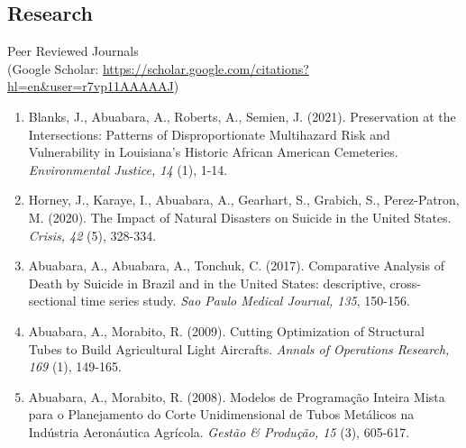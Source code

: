 \documentclass[11pt,oneside]{article}
\begin{document}
\subsection*{Research}

{Peer Reviewed Journals}\\{\small (Google Scholar: \url{https://scholar.google.com/citations?hl=en&user=r7vp11AAAAAJ})}
\begin{enumerate}[leftmargin=20pt]
\item Blanks, J., Abuabara, A., Roberts, A., Semien, J. (2021). Preservation at the Intersections: Patterns of Disproportionate Multihazard Risk and Vulnerability in Louisiana's Historic African American Cemeteries. \emph{Environmental Justice, 14} (1), 1-14.
\item Horney, J., Karaye, I., Abuabara, A., Gearhart, S., Grabich, S., Perez-Patron, M. (2020). The Impact of Natural Disasters on Suicide in the United States. \emph{Crisis, 42} (5), 328-334.
\item Abuabara, A., Abuabara, A., Tonchuk, C. (2017). Comparative Analysis of Death by Suicide in Brazil and in the United States: descriptive, cross-sectional time series study. \emph{Sao Paulo Medical Journal, 135}, 150-156.
\item Abuabara, A., Morabito, R. (2009). Cutting Optimization of Structural Tubes to Build Agricultural Light Aircrafts. \emph{Annals of Operations Research, 169} (1), 149-165.
\item Abuabara, A., Morabito, R. (2008). Modelos de Programação Inteira Mista para o Planejamento do Corte Unidimensional de Tubos Metálicos na Indústria Aeronáutica Agrícola. \emph{Gestão \& Produção, 15} (3), 605-617.
\end{enumerate}

\vspace{1pt}
\end{document}
